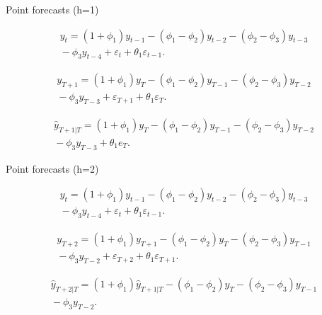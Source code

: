 \documentclass[14pt,ignorenonframetext,]{beamer}
\begin{document}
\begin{frame}{Point forecasts (h=1)}

\fontsize{14}{14}\sf

\begin{block}{}
\begin{align*}
y_t = (1+\phi_1)y_{t-1} -(\phi_1-\phi_2)y_{t-2} - (\phi_2-\phi_3)y_{t-3}\\\mbox{} -\phi_3y_{t-4} + \varepsilon_t+\theta_1\varepsilon_{t-1}.
\end{align*}
\end{block}

\pause
{}

\begin{align*}
y_{T+1} = (1+\phi_1)y_{T} -(\phi_1-\phi_2)y_{T-1} - (\phi_2-\phi_3)y_{T-2}\\\mbox{} -\phi_3y_{T-3} + \varepsilon_{T+1}+\theta_1\varepsilon_{T}.
\end{align*}

\pause
{}

\begin{align*}
\hat{y}_{T+1|T} = (1+\phi_1)y_{T} -(\phi_1-\phi_2)y_{T-1} - (\phi_2-\phi_3)y_{T-2}\\\mbox{} -\phi_3y_{T-3} + \theta_1 e_{T}.
\end{align*}

\end{frame}

\begin{frame}{Point forecasts (h=2)}

\fontsize{14}{14}\sf

\begin{block}{}
\begin{align*}
y_t = (1+\phi_1)y_{t-1} -(\phi_1-\phi_2)y_{t-2} - (\phi_2-\phi_3)y_{t-3}\\\mbox{} -\phi_3y_{t-4} + \varepsilon_t+\theta_1\varepsilon_{t-1}.
\end{align*}
\end{block}

\pause
{}

\begin{align*}
y_{T+2} = (1+\phi_1)y_{T+1} -(\phi_1-\phi_2)y_{T} - (\phi_2-\phi_3)y_{T-1}\\\mbox{} -\phi_3y_{T-2} + \varepsilon_{T+2}+\theta_1\varepsilon_{T+1}.
\end{align*}

\pause
{}

\begin{align*}
\hat{y}_{T+2|T} = (1+\phi_1)\hat{y}_{T+1|T} -(\phi_1-\phi_2)y_{T} - (\phi_2-\phi_3)y_{T-1}\\\mbox{} -\phi_3y_{T-2}.
\end{align*}

\end{frame}
\end{document}
